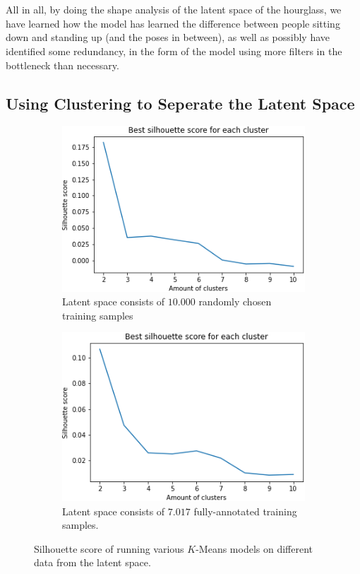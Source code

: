 \documentclass[./main.tex]{subfiles}
\begin{document}
\\
\\
All in all, by doing the shape analysis of the latent space of the hourglass, we have learned how the model has learned the difference between people sitting down and standing up (and the poses in between), as well as possibly have identified some redundancy, in the form of the model using more filters in the bottleneck than necessary.

\subsection{Using Clustering to Seperate the Latent Space}\label{subsec:clustering}
\begin{figure}[htbp]
    \centering
    \begin{subfigure}{7 cm}
        \centering
        \includegraphics[width = 7 cm]{entities/silhouette_score_all_skeletons.png}
        \caption{Latent space consists of $10.000$ randomly chosen training samples}
        \label{fig:silhouette_all}
    \end{subfigure}
    \begin{subfigure}{7 cm}
        \centering
        \includegraphics[width = 7 cm]{entities/silhouette_score_full_skeletons.png}
        \caption{Latent space consists of $7.017$ fully-annotated training samples.}
        \label{fig:silhouette_full}
    \end{subfigure}
    \caption{Silhouette score of running various $K$-Means models on different data from the latent space.}
\end{figure}
\end{document}
